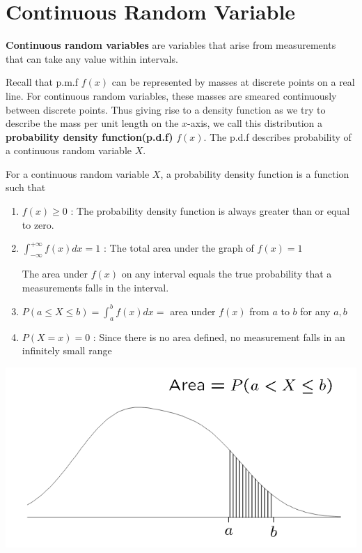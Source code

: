 \documentclass[12pt, titlepage, oneside]{article}
\renewcommand{\b}[1]{\textbf{#1}}
\begin{document}
	\setcounter{section}{7}
	\setcounter{page}{22}

    \section{Continuous Random Variable }

    \b{Continuous random variables} are variables that arise from measurements that can take any value within intervals.

    Recall that p.m.f $f(x)$ can be represented by masses at discrete points on a real line. For continuous random variables, these masses are smeared continuously between discrete points. Thus giving rise to a density function as we try to describe the mass per unit length on the $x$-axis, we call this distribution a \b{probability density function(p.d.f)} $f(x)$. The p.d.f describes probability of a continuous random variable $X$.

    For a continuous random variable $X$, a probability density function is a function such that
    \begin{enumerate}
      \item $f(x) \geq 0$ : The probability density function is always greater than or equal to zero.
      \item $\int_{-\infty}^{+\infty} f(x) dx = 1$ : The total area under the graph of $f(x) = 1$

      The area under $f(x)$ on any interval equals the true probability that a measurements falls in the interval.

      \item $P(a \leq X \leq b) = \int_a^b f(x) dx = $ area under $f(x)$ from $a$ to $b$ for any $a,b$

      \item $P(X = x) = 0$ :  Since there is no area defined, no measurement falls in an infinitely small range
    \end{enumerate}

          \begin{center}
        \includegraphics[scale=0.5]{1.png}
       \end{center}
    
\end{document}
